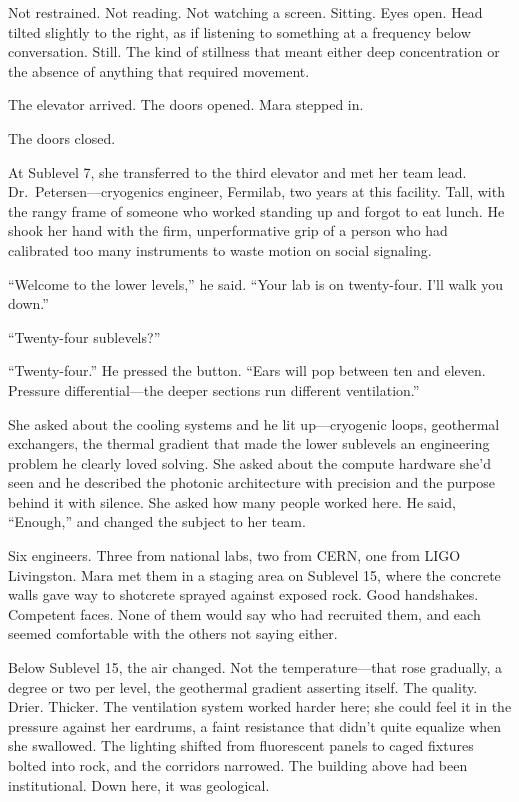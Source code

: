 \documentclass[12pt]{article}
\begin{document}
Not restrained. Not reading. Not watching a screen. Sitting. Eyes open. Head tilted slightly to the right, as if listening to something at a frequency below conversation. Still. The kind of stillness that meant either deep concentration or the absence of anything that required movement.

The elevator arrived. The doors opened. Mara stepped in.

The doors closed.

At Sublevel 7, she transferred to the third elevator and met her team lead. Dr.\ Petersen---cryogenics engineer, Fermilab, two years at this facility. Tall, with the rangy frame of someone who worked standing up and forgot to eat lunch. He shook her hand with the firm, unperformative grip of a person who had calibrated too many instruments to waste motion on social signaling.

``Welcome to the lower levels,'' he said. ``Your lab is on twenty-four. I'll walk you down.''

``Twenty-four sublevels?''

``Twenty-four.'' He pressed the button. ``Ears will pop between ten and eleven. Pressure differential---the deeper sections run different ventilation.''

She asked about the cooling systems and he lit up---cryogenic loops, geothermal exchangers, the thermal gradient that made the lower sublevels an engineering problem he clearly loved solving. She asked about the compute hardware she'd seen and he described the photonic architecture with precision and the purpose behind it with silence. She asked how many people worked here. He said, ``Enough,'' and changed the subject to her team.

Six engineers. Three from national labs, two from CERN, one from LIGO Livingston. Mara met them in a staging area on Sublevel 15, where the concrete walls gave way to shotcrete sprayed against exposed rock. Good handshakes. Competent faces. None of them would say who had recruited them, and each seemed comfortable with the others not saying either.

Below Sublevel 15, the air changed. Not the temperature---that rose gradually, a degree or two per level, the geothermal gradient asserting itself. The quality. Drier. Thicker. The ventilation system worked harder here; she could feel it in the pressure against her eardrums, a faint resistance that didn't quite equalize when she swallowed. The lighting shifted from fluorescent panels to caged fixtures bolted into rock, and the corridors narrowed. The building above had been institutional. Down here, it was geological.
\end{document}
